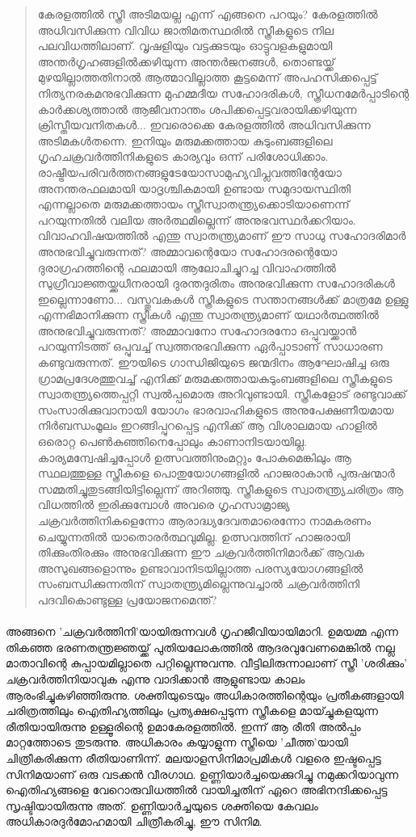 \begin{quotation}
\noindent കേരളത്തിൽ സ്ത്രീ അടിമയല്ല എന്ന് എങ്ങനെ പറയും? കേരളത്തിൽ അധിവസിക്കുന്ന വിവിധ ജാതിമതസ്ഥരിൽ സ്ത്രീകളുടെ നില പലവിധത്തിലാണ്. വൃഷളിയും വട്ടക്കുടയും ഓട്ടുവളകളുമായി അന്തർഗൃഹങ്ങളിൽക്കഴിയുന്ന അന്തർജനങ്ങൾ, തൊണ്ടയ്ക്ക് മുഴയില്ലാത്തതിനാൽ ആത്മാവില്ലാത്ത കൂട്ടമെന്ന് അപഹസിക്കപ്പെട്ട് നിത്യനരകമനുഭവിക്കുന്ന മുഹമ്മദീയ സഹോദരികൾ, സ്ത്രീധനമേർപ്പാടിന്റെ കാർക്കശ്യത്താൽ ആജീവനാന്തം ശപിക്കപ്പെട്ടവരായിക്കഴിയുന്ന ക്രിസ്തീയവനിതകൾ... ഇവരൊക്കെ കേരളത്തിൽ അധിവസിക്കുന്ന അടിമകൾതന്നെ. ഇനിയും മരുമക്കത്തായ കുടുംബങ്ങളിലെ ഗൃഹചക്രവർത്തിനികളുടെ കാര്യവും ഒന്ന് പരിശോധിക്കാം. രാഷ്ട്രീയപരിവർത്തനങ്ങളുടേയോസാമുഹ്യവിപ്ലവത്തിന്റേയോ അനന്തരഫലമായി യാദൃശ്ചികമായി ഉണ്ടായ സമുദായസ്ഥിതി എന്നല്ലാതെ മരുമക്കത്തായം സ്ത്രീസ്വാതന്ത്ര്യക്കൊടിയാണെന്ന് പറയുന്നതിൽ വലിയ അർത്ഥമില്ലെന്ന് അനുഭവസ്ഥർക്കറിയാം. വിവാഹവിഷയത്തിൽ എന്തു സ്വാതന്ത്ര്യമാണ് ഈ സാധു സഹോദരിമാർ അനുഭവിച്ചുവരുന്നത്? അമ്മാവന്റെയോ സഹോദരന്റെയോ ദുരാഗ്രഹത്തിന്റെ ഫലമായി ആലോചിച്ചുറച്ച വിവാഹത്തിൽ സുഗ്രീവാജ്ഞയ്ക്കധീനരായി ദുരന്തദുരിതം അനുഭവിക്കുന്ന സഹോദരികൾ ഇല്ലെന്നാണോ... വസ്തുവകകൾ സ്ത്രീകളുടെ സന്താനങ്ങൾക്ക് മാത്രമേ ഉള്ളു എന്നഭിമാനിക്കുന്ന സ്ത്രീകൾ എന്തു സ്വാതന്ത്ര്യമാണ് യഥാർത്ഥത്തിൽ അനുഭവിച്ചുവരുന്നത്? അമ്മാവനോ സഹോദരനോ ഒപ്പുവയ്ക്കാൻ പറയുന്നിടത്ത് ഒപ്പുവച്ച് സ്വത്തനുഭവിക്കുന്ന ഏർപ്പാടാണ് സാധാരണ കണ്ടുവരുന്നത്. ഈയിടെ ഗാന്ധിജിയുടെ ജന്മദിനം ആഘോഷിച്ച ഒരു ഗ്രാമപ്രദേശത്തുവച്ച് എനിക്ക് മരുമക്കത്തായകുടുംബങ്ങളിലെ സ്ത്രീകളുടെ സ്വാതന്ത്ര്യത്തെപ്പറ്റി സ്വൽപ്പമൊരു അറിവുണ്ടായി. സ്ത്രീകളോട് രണ്ടുവാക്ക് സംസാരിക്കുവാനായി യോഗം ഭാരവാഹികളുടെ അനുപേക്ഷണീയമായ നിർബന്ധംമൂലം ഇറങ്ങിപ്പുറപ്പെട്ട എനിക്ക് ആ വിശാലമായ ഹാളിൽ ഒരൊറ്റ പെൺകുഞ്ഞിനെപ്പോലും കാണാനിടയായില്ല. കാര്യമന്വേഷിച്ചപ്പോൾ ഉത്സവത്തിനുംമറ്റും പോകുമെങ്കിലും ആ സ്ഥലത്തുള്ള സ്ത്രീകളെ പൊതുയോഗങ്ങളിൽ ഹാജരാകാൻ പുരുഷന്മാർ സമ്മതിച്ചുതുടങ്ങിയിട്ടില്ലെന്ന് അറിഞ്ഞു. സ്ത്രീകളുടെ സ്വാതന്ത്ര്യചരിത്രം ആ വിധത്തിൽ ഇരിക്കുമ്പോൾ അവരെ ഗൃഹസാമ്രാജ്യ ചക്രവർത്തിനികളെന്നോ ആരാദ്ധ്യദേവതമാരെന്നോ നാമകരണം ചെയ്യുന്നതിൽ യാതൊരർത്ഥവുമില്ല. ഉത്സവത്തിന് ഹാജരായി തിക്കുംതിരക്കും അനുഭവിക്കുന്ന ഈ ചക്രവർത്തിനിമാർക്ക് ആവക അസുഖങ്ങളൊന്നും ഉണ്ടാവാനിടയില്ലാത്ത പരസ്യയോഗങ്ങളിൽ സംബന്ധിക്കുന്നതിന് സ്വാതന്ത്ര്യമില്ലെന്നുവച്ചാൽ ചക്രവർത്തിനി പദവികൊണ്ടുള്ള പ്രയോജനമെന്ത്?
\end{quotation}


\paragraph{
}

അങ്ങനെ 'ചക്രവർത്തിനി'യായിരുന്നവൾ ഗൃഹജീവിയായിമാറി. ഉമയമ്മ എന്ന തികഞ്ഞ ഭരണതന്ത്രജ്ഞയ്ക്ക് പുതിയലോകത്തിൽ ആദരവുവേണമെങ്കിൽ നല്ല മാതാവിന്റെ കുപ്പായമില്ലാതെ പറ്റില്ലെന്നുവന്നു. വീട്ടിലിരുന്നാലാണ് സ്ത്രീ 'ശരിക്കും' ചക്രവർത്തിനിയാവുക എന്നു വാദിക്കാൻ ആളുണ്ടായ കാലം ആരംഭിച്ചുകഴിഞ്ഞിരുന്നു. ശക്തിയുടെയും അധികാരത്തിന്റെയും പ്രതീകങ്ങളായി ചരിത്രത്തിലും ഐതിഹ്യത്തിലും പ്രത്യക്ഷപ്പെടുന്ന സ്ത്രീകളെ മായ്ച്ചുകളയുന്ന രീതിയായിരുന്നു ഉള്ളൂരിന്റെ ഉമാകേരളത്തിൽ. ഇന്ന് ആ രീതി അൽപ്പം മാറ്റത്തോടെ തുടരുന്നു. അധികാരം കയ്യാളുന്ന സ്ത്രീയെ 'ചീത്ത'യായി ചിത്രീകരിക്കുന്ന രീതിയാണിന്ന്. മലയാളസിനിമാപ്രമികൾ വളരെ ഇഷ്ടപ്പെട്ട സിനിമയാണ് ഒരു വടക്കൻ വീരഗാഥ. ഉണ്ണിയാർച്ചയെക്കുറിച്ചു നമുക്കറിയാവുന്ന ഐതിഹ്യങ്ങളെ വേറൊരുവിധത്തിൽ വായിച്ചതിന് ഏറെ അഭിനന്ദിക്കപ്പെട്ട സൃഷ്ടിയായിരുന്നു അത്. ഉണ്ണിയാർച്ചയുടെ ശക്തിയെ കേവലം അധികാരദുർമോഹമായി ചിത്രീകരിച്ചു, ഈ സിനിമ.
